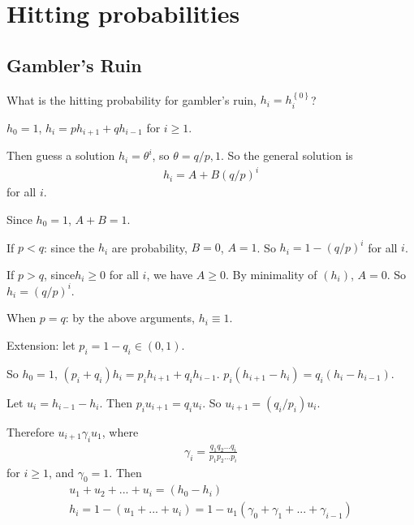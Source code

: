 \documentclass[a4paper]{article}
\begin{document}
\newpage

\section{Hitting probabilities}

\subsection{Gambler's Ruin}
What is the hitting probability for gambler's ruin, $h_i = h_i^{\left\{0\right\}}$?

$h_0=1$, $h_i = ph_{i+1} + qh_{i-1}$ for $i \geq 1$.

Then guess a solution $h_i = \theta^i$, so $\theta = q/p,1$. So the general solution is
\begin{equation*}
\begin{aligned}
h_i = A+B\left(q/p\right)^i
\end{aligned}
\end{equation*}
for all $i$.

Since $h_0=1$, $A+B=1$.

If $p<q$: since the $h_i$ are probability, $B=0$, $A=1$. So $h_i = 1-\left(q/p\right)^i$ for all $i$.

If $p>q$, since$h_i \geq 0$ for all $i$, we have $A \geq 0$. By minimality of $\left(h_i\right)$, $A=0$. So $h_i = \left(q/p\right)^i$.

When $p=q$: by the above arguments, $h_i \equiv 1$.

Extension: let $p_i = 1-q_i \in \left(0,1\right)$.

So $h_0=1$, $\left(p_i+q_i\right)h_i = p_i h_{i+1} + q_i h_{i-1}$. $p_i\left(h_{i+1} - h_i\right) = q_i \left(h_i-h_{i-1}\right)$.

Let $u_i = h_{i-1} - h_i$. Then $p_i u_{i+1} = q_i u_i$. So $u_{i+1} = \left(q_i/p_i\right)u_i$.

Therefore $u_{i+1}\gamma_i u_1$, where
\begin{equation*}
\begin{aligned}
\gamma_i = \frac{q_1 q_2...q_i}{p_1 p_2 ... p_i}
\end{aligned}
\end{equation*}
for $i \geq 1$, and $\gamma_0 = 1$. Then
\begin{equation*}
\begin{aligned}
u_1+u_2+...+u_i = \left(h_0-h_i\right)\\
h_i = 1-\left(u_1+...+u_i\right)=1-u_1\left(\gamma_0+\gamma_1+...+\gamma_{i-1}\right)
\end{aligned}
\end{equation*}
\end{document}
